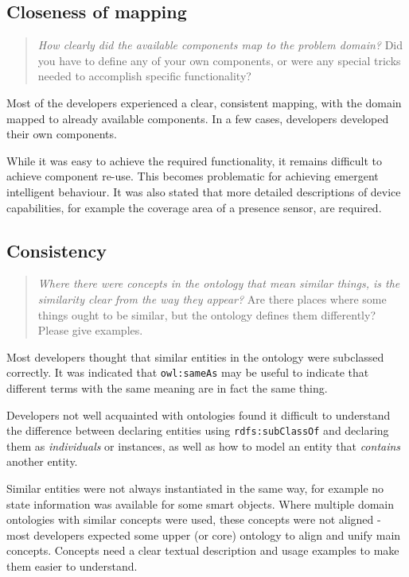 \subsection{Closeness of mapping}
\label{resultsCloseness}

\begin{quote}
	\emph{How clearly did the available components map to the problem domain?}
	Did you have to define any of your own components, or were any special tricks needed to accomplish specific functionality?
\end{quote}


Most of the developers experienced a clear, consistent mapping, with the domain mapped to already available components. In a few cases, developers developed their own components.

While it was easy to achieve the required functionality, it remains difficult to achieve component re-use. This becomes problematic for achieving emergent intelligent behaviour. 
It was also stated that more detailed descriptions of device capabilities, for example the coverage area of a presence sensor, are required.


\subsection{Consistency}

\begin{quote}
	\emph{Where there were concepts in the ontology that mean similar things, is the similarity clear from the way they appear?}
	Are there places where some things ought to be similar, but the ontology defines them differently? Please give examples.
\end{quote}

Most developers thought that similar entities in the ontology were subclassed correctly. It was indicated that \texttt{owl:sameAs} may be useful to indicate that different terms with the same meaning are in fact the same thing.

Developers not well acquainted with ontologies found it difficult to understand the difference between declaring entities using \texttt{rdfs:subClassOf} and declaring them as \emph{individuals} or instances, as well as how to model an entity that \emph{contains} another entity.

Similar entities were not always instantiated in the same way, for example no state information was available for some smart objects.
Where multiple domain ontologies with similar concepts were used, these concepts were not aligned - most developers expected some upper (or core) ontology to align and unify main concepts.
Concepts need a clear textual description and usage examples to make them easier to understand.

